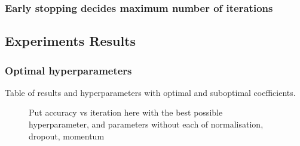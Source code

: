 \subsubsection{Early stopping decides maximum number of iterations}

\subsection{Experiments Results}
\subsubsection{Optimal hyperparameters}

Table of results and hyperparameters with optimal and suboptimal coefficients.

\begin{figure}
	\centering
\caption{Put accuracy vs iteration here with the best possible hyperparameter, and parameters without each of normalisation, dropout, momentum}\label{noisesklnmff}
\end{figure}


